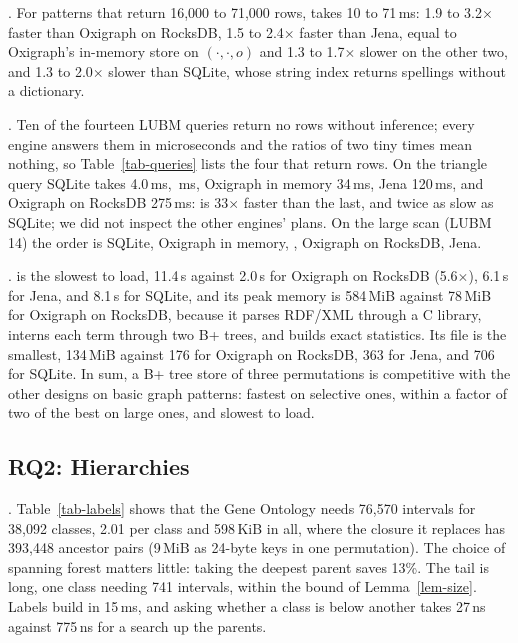 .
For patterns that return 16,000 to 71,000 rows, \sys takes 10 to 71\,ms: 1.9 to
3.2$\times$ faster than Oxigraph on RocksDB, 1.5 to 2.4$\times$ faster than
Jena, equal to Oxigraph's in-memory store on $(\cdot,\cdot,o)$ and 1.3 to
1.7$\times$ slower on the other two, and 1.3 to 2.0$\times$ slower than SQLite,
whose string index returns spellings without a dictionary.

.
Ten of the fourteen LUBM queries return no rows without inference; every
engine answers them in microseconds and the ratios of two tiny times mean
nothing, so Table~\ref{tab-queries} lists the four that return rows.
On the triangle query SQLite takes 4.0\,ms, \,ms, Oxigraph in memory
34\,ms, Jena 120\,ms, and Oxigraph on RocksDB 275\,ms: \sys is 33$\times$
faster than the last, and twice as slow as SQLite; we did not inspect the
other engines' plans.
On the large scan (LUBM 14) the order is SQLite, Oxigraph in memory, \sys,
Oxigraph on RocksDB, Jena.

.
\sys is the slowest to load, 11.4\,s against 2.0\,s for Oxigraph on RocksDB
(5.6$\times$), 6.1\,s for Jena, and 8.1\,s for SQLite, and its peak
memory is 584\,MiB against 78\,MiB for Oxigraph on RocksDB, because it
parses RDF/XML through a C library, interns each term through two B+ trees,
and builds exact statistics.
Its file is the smallest, 134\,MiB against 176 for Oxigraph on RocksDB, 363
for Jena, and 706 for SQLite.
In sum, a B+ tree store of three permutations is competitive with the
other designs on basic graph patterns: fastest on selective ones, within a
factor of two of the best on large ones, and slowest to load.

\subsection{RQ2: Hierarchies}

.
Table~\ref{tab-labels} shows that the Gene Ontology needs 76,570 intervals for
38,092 classes, 2.01 per class and 598\,KiB in all, where the closure it
replaces has 393,448 ancestor pairs (9\,MiB as 24-byte keys in one
permutation).
The choice of spanning forest matters little: taking the deepest parent saves
13\%.
The tail is long, one class needing 741 intervals, within the bound of
Lemma~\ref{lem-size}.
Labels build in 15\,ms, and asking whether a class is below another takes
27\,ns against 775\,ns for a search up the parents.

\begin{table}[t]
\caption{Interval labels for the Gene Ontology.}
\label{tab-labels}
\small
{}
\end{table}

